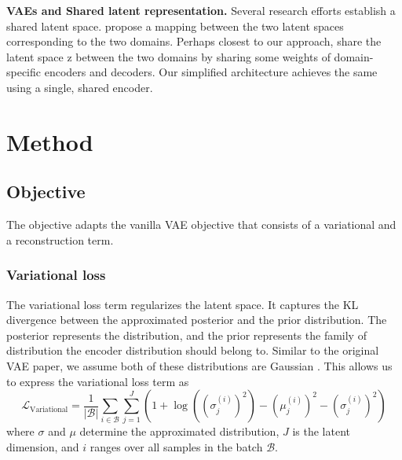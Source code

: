 \documentclass{article}
\begin{document}
\textbf{VAEs and Shared latent representation.} Several research efforts establish a shared latent space. \citet{zhao} propose a mapping between the two latent spaces corresponding to the two domains. Perhaps closest to our approach, \citet{liu} share the latent space z between the two domains by sharing some weights of domain-specific encoders and decoders. Our simplified architecture achieves the same using a single, shared encoder.

\section{Method}
\subsection{Objective}
The objective adapts the vanilla VAE objective that consists of a variational and a reconstruction term.
\subsubsection{Variational loss}
The variational loss term regularizes the latent space. It captures the KL divergence between the approximated posterior and the prior distribution. The posterior represents the  distribution, and the prior represents the family of distribution the encoder distribution should belong to. Similar to the original VAE paper, we assume both of these distributions are Gaussian \citep{kingma}. This allows us to express the variational loss term as
\begin{equation}
  \mathcal{L}_{\text{Variational}}
    = \frac{1}{\left|\mathcal{B}\right|} \sum_{i \in \mathcal{B}} \sum_{j=1}^J \left(
      1
      + \log\left(
        \left(
          \sigma_j^{(i)}
        \right)^2
      \right)
      - \left(\mu_j^{(i)}\right)^2 
      - \left(\sigma_j^{(i)}\right)^2 
    \right)
\end{equation}
where $\sigma$ and $\mu$ determine the approximated  distribution, $J$ is the latent dimension, and $i$ ranges over all samples in the batch $\mathcal{B}$.
\end{document}
